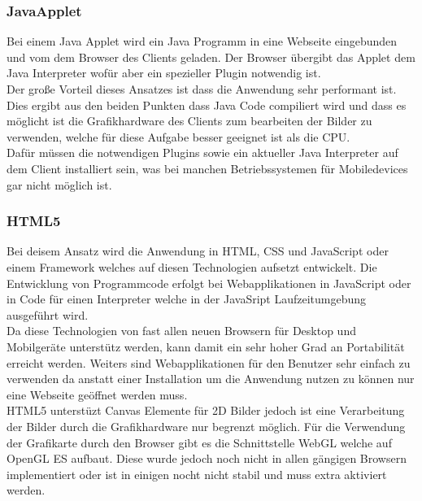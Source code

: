 \subsubsection{JavaApplet}
\label{sec:JavaApplet}
Bei einem Java Applet wird ein Java Programm in eine Webseite eingebunden und vom dem Browser des Clients geladen.
Der Browser übergibt das Applet dem Java Interpreter wofür aber ein spezieller Plugin notwendig ist.
\\
Der große Vorteil dieses Ansatzes ist dass die Anwendung sehr performant ist.
Dies ergibt aus den beiden Punkten dass Java Code compiliert wird und dass es möglicht ist die Grafikhardware des Clients zum bearbeiten der Bilder zu verwenden,
welche für diese Aufgabe besser geeignet ist als die CPU.
\\
Dafür müssen die notwendigen Plugins sowie ein aktueller Java Interpreter auf dem Client installiert sein, 
was bei manchen Betriebssystemen für Mobiledevices gar nicht möglich ist.
\cite{japp}

\subsubsection{HTML5}
\label{sec:HTML5}
Bei deisem Ansatz wird die Anwendung in HTML, CSS und JavaScript oder einem Framework welches auf diesen Technologien aufsetzt entwickelt.
Die Entwicklung von Programmcode erfolgt bei Webapplikationen in JavaScript oder in Code für einen Interpreter welche in der JavaSript Laufzeitumgebung ausgeführt wird.
\\
Da diese Technologien von fast allen neuen Browsern für Desktop und Mobilgeräte unterstütz werden, kann damit ein sehr hoher Grad an Portabilität erreicht werden.
Weiters sind Webapplikationen für den Benutzer sehr einfach zu verwenden da anstatt einer Installation um die Anwendung nutzen zu können nur eine Webseite geöffnet werden muss.
\cite{html-14}
\\
HTML5 unterstüzt Canvas Elemente für 2D Bilder jedoch ist eine Verarbeitung der Bilder durch die Grafikhardware nur begrenzt möglich.
Für die Verwendung der Grafikarte durch den Browser gibt es die Schnittstelle WebGL welche auf OpenGL ES aufbaut.
Diese wurde jedoch noch nicht in allen gängigen Browsern implementiert oder ist in einigen nocht nicht stabil und muss extra aktiviert werden.
\cite{webgl-14}


